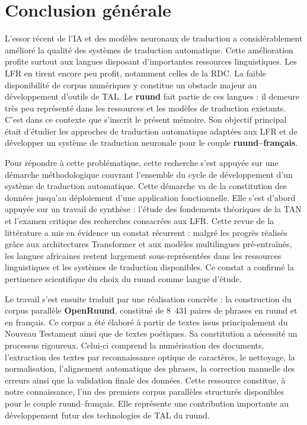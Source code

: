 \chapter{Conclusion générale}
\label{chap:conclusion_generale}

L'essor récent de l'\ac{IA} et des modèles neuronaux de traduction a considérablement amélioré la qualité des systèmes de traduction automatique. Cette amélioration profite surtout aux langues disposant d'importantes ressources linguistiques. Les \ac{LFR} en tirent encore peu profit, notamment celles de la RDC. La faible disponibilité de corpus numériques y constitue un obstacle majeur au développement d'outils de \ac{TAL}. Le \textbf{ruund} fait partie de ces langues : il demeure très peu représenté dans les ressources et les modèles de traduction existants. C'est dans ce contexte que s'inscrit le présent mémoire. Son objectif principal était d'étudier les approches de traduction automatique adaptées aux \ac{LFR} et de développer un système de traduction neuronale pour le couple \textbf{ruund--français}.

Pour répondre à cette problématique, cette recherche s'est appuyée sur une démarche méthodologique couvrant l'ensemble du cycle de développement d'un système de traduction automatique. Cette démarche va de la constitution des données jusqu'au déploiement d'une application fonctionnelle. Elle s'est d'abord appuyée sur un travail de synthèse : l'étude des fondements théoriques de la \ac{TAN} et l'examen critique des recherches consacrées aux \ac{LFR}. Cette revue de la littérature a mis en évidence un constat récurrent : malgré les progrès réalisés grâce aux architectures Transformer et aux modèles multilingues pré-entraînés, les langues africaines restent largement sous-représentées dans les ressources linguistiques et les systèmes de traduction disponibles. Ce constat a confirmé la pertinence scientifique du choix du ruund comme langue d'étude.

Le travail s'est ensuite traduit par une réalisation concrète : la construction du corpus parallèle \textbf{OpenRuund}, constitué de 8~431 paires de phrases en ruund et en français. Ce corpus a été élaboré à partir de textes issus principalement du Nouveau Testament ainsi que de textes poétiques. Sa constitution a nécessité un processus rigoureux. Celui-ci comprend la numérisation des documents, l'extraction des textes par reconnaissance optique de caractères, le nettoyage, la normalisation, l'alignement automatique des phrases, la correction manuelle des erreurs ainsi que la validation finale des données. Cette ressource constitue, à notre connaissance, l'un des premiers corpus parallèles structurés disponibles pour le couple ruund--français. Elle représente une contribution importante au développement futur des technologies de \ac{TAL} du ruund.

